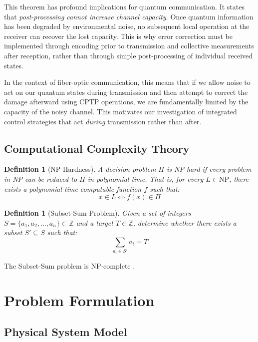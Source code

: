 \documentclass[12pt,a4paper]{article}
\newtheorem{definition}[theorem]{Definition}
\newcommand{\Z}{\mathbb{Z}}
\begin{document}
This theorem has profound implications for quantum communication. It states that \emph{post-processing cannot increase channel capacity}. Once quantum information has been degraded by environmental noise, no subsequent local operation at the receiver can recover the lost capacity. This is why error correction must be implemented through encoding prior to transmission and collective measurements after reception, rather than through simple post-processing of individual received states.

In the context of fiber-optic communication, this means that if we allow noise to act on our quantum states during transmission and then attempt to correct the damage afterward using CPTP operations, we are fundamentally limited by the capacity of the noisy channel. This motivates our investigation of integrated control strategies that act \emph{during} transmission rather than after.

\subsection{Computational Complexity Theory}

\begin{definition}[NP-Hardness]
A decision problem $\Pi$ is NP-hard if every problem in NP can be reduced to $\Pi$ in polynomial time. That is, for every $L \in \text{NP}$, there exists a polynomial-time computable function $f$ such that:
\begin{equation}
x \in L \iff f(x) \in \Pi
\end{equation}
\end{definition}

\begin{definition}[Subset-Sum Problem]
Given a set of integers $S = \{a_1, a_2, \ldots, a_n\} \subset \Z$ and a target $T \in \Z$, determine whether there exists a subset $S' \subseteq S$ such that:
\begin{equation}
\sum_{a_i \in S'} a_i = T
\end{equation}
\end{definition}

The Subset-Sum problem is NP-complete \cite{karp1972}.

\section{Problem Formulation}

\subsection{Physical System Model}
\end{document}
